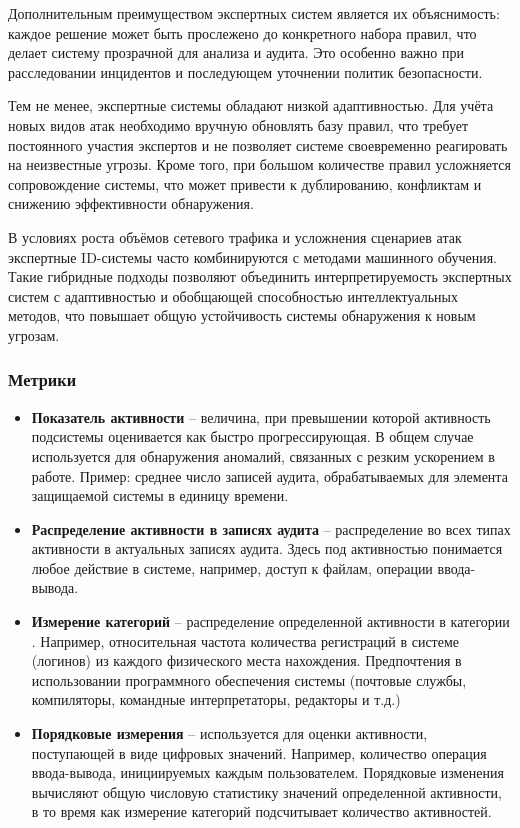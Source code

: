 Дополнительным преимуществом экспертных систем является их объяснимость: каждое решение может быть прослежено до конкретного набора правил, что делает систему прозрачной для анализа и аудита. Это особенно важно при расследовании инцидентов и последующем уточнении политик безопасности.

Тем не менее, экспертные системы обладают низкой адаптивностью. Для учёта новых видов атак необходимо вручную обновлять базу правил, что требует постоянного участия экспертов и не позволяет системе своевременно реагировать на неизвестные угрозы. Кроме того, при большом количестве правил усложняется сопровождение системы, что может привести к дублированию, конфликтам и снижению эффективности обнаружения.

В условиях роста объёмов сетевого трафика и усложнения сценариев атак экспертные ID-системы часто комбинируются с методами машинного обучения. Такие гибридные подходы позволяют объединить интерпретируемость экспертных систем с адаптивностью и обобщающей способностью интеллектуальных методов, что повышает общую устойчивость системы обнаружения к новым угрозам.


\subsubsection{Метрики}

\begin{itemize}
	\item \textbf{Показатель активности} -- величина, при превышении которой активность
	подсистемы оценивается как быстро прогрессирующая. В общем случае используется для
	обнаружения аномалий, связанных с резким ускорением в работе. Пример: среднее число
	записей аудита, обрабатываемых для элемента защищаемой системы в единицу времени.

	\item \textbf{Распределение активности в записях аудита} -- распределение во всех типах
	активности в актуальных записях аудита. Здесь под активностью понимается любое действие
	в системе, например, доступ к файлам, операции ввода-вывода.

	\item \textbf{Измерение категорий} -- распределение определенной активности в
	категории \footnotemark. Например, относительная частота количества регистраций в
	системе (логинов) из каждого физического места нахождения. Предпочтения в использовании
	программного обеспечения системы (почтовые службы, компиляторы, командные интерпретаторы,
	редакторы и т.д.)

	\item \textbf{Порядковые измерения} -- используется для оценки активности, поступающей
	в виде цифровых значений. Например, количество операция ввода-вывода, инициируемых каждым
	пользователем. Порядковые изменения вычисляют общую числовую статистику значений определенной
	активности, в то время как измерение категорий подсчитывает количество активностей.
\end{itemize}
\autocite{BeynonDavies}



